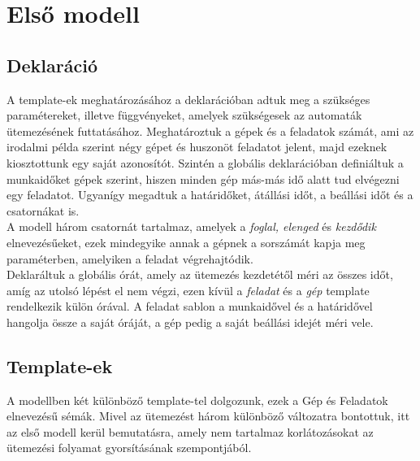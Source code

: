 \documentclass {report}
\begin{document}
    \section{Első modell}
    \subsection{Deklaráció}
     A template-ek meghatározásához a deklarációban adtuk meg a szükséges paramétereket, illetve függvényeket, amelyek szükségesek az automaták ütemezésének futtatásához. Meghatároztuk a gépek és a feladatok számát, ami az irodalmi példa szerint négy gépet és huszonöt feladatot jelent, majd ezeknek kiosztottunk egy saját azonosítót. Szintén a globális deklarációban definiáltuk a munkaidőket gépek szerint, hiszen minden gép más-más idő alatt tud elvégezni egy feladatot. Ugyanígy megadtuk a határidőket, átállási időt, a beállási időt és a csatornákat is.\\
     A modell három csatornát tartalmaz, amelyek a \emph{foglal, elenged} és \emph{kezdődik} elnevezésűeket, ezek mindegyike annak a gépnek a sorszámát kapja meg paraméterben, amelyiken a feladat végrehajtódik.\\ 
      Deklaráltuk a globális órát, amely az ütemezés kezdetétől méri az összes időt, amíg az utolsó lépést el nem végzi, ezen kívül a \emph{feladat} és a \emph{gép} template rendelkezik külön órával. A feladat sablon a munkaidővel és a határidővel hangolja össze a saját óráját, a gép pedig a saját beállási idejét méri vele. 
    \subsection{Template-ek}
    A modellben két különböző template-tel dolgozunk, ezek a Gép és Feladatok elnevezésű sémák. Mivel az ütemezést három különböző változatra bontottuk, itt az első modell kerül bemutatásra, amely nem tartalmaz korlátozásokat az ütemezési folyamat gyorsításának szempontjából.\\
\end{document}
